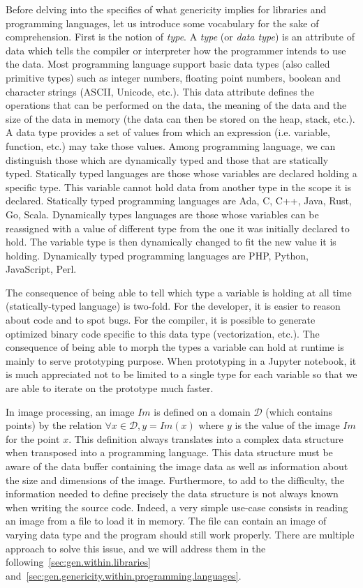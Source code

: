 Before delving into the specifics of what genericity implies for libraries and programming languages, let us introduce
some vocabulary for the sake of comprehension. First is the notion of \emph{type}. A \emph{type} (or \emph{data type})
is an attribute of data which tells the compiler or interpreter how the programmer intends to use the data. Most
programming language support basic data types (also called primitive types) such as integer numbers, floating point
numbers, boolean and character strings (ASCII, Unicode, etc.). This data attribute defines the operations that can be
performed on the data, the meaning of the data and the size of the data in memory (the data can then be stored on the
heap, stack, etc.). A data type provides a set of values from which an expression (i.e. variable, function, etc.) may
take those values. Among programming language, we can distinguish those which are dynamically typed and those that are
statically typed. Statically typed languages are those whose variables are declared holding a specific type. This
variable cannot hold data from another type in the scope it is declared. Statically typed programming languages are Ada,
C, C++, Java, Rust, Go, Scala. Dynamically types languages are those whose variables can be reassigned with a value of
different type from the one it was initially declared to hold. The variable type is then dynamically changed to fit the
new value it is holding. Dynamically typed programming languages are PHP, Python, JavaScript, Perl.

The consequence of being able to tell which type a variable is holding at all time (statically-typed language) is
two-fold. For the developer, it is easier to reason about code and to spot bugs. For the compiler, it is possible to
generate optimized binary code specific to this data type (vectorization, etc.). The consequence of being able to morph
the types a variable can hold at runtime is mainly to serve prototyping purpose. When prototyping in a Jupyter notebook,
it is much appreciated not to be limited to a single type for each variable so that we are able to iterate on the
prototype much faster.

In image processing, an image \(Im\) is defined on a domain \(\mathcal{D}\) (which contains points) by the relation
\(\forall x \in \mathcal{D}, y = Im(x)\) where \(y\) is the value of the image \(Im\) for the point \(x\). This
definition always translates into a complex data structure when transposed into a programming language. This data
structure must be aware of the data buffer containing the image data as well as information about the size and
dimensions of the image. Furthermore, to add to the difficulty, the information needed to define precisely the data
structure is not always known when writing the source code. Indeed, a very simple use-case consists in reading an image
from a file to load it in memory. The file can contain an image of varying data type and the program should still work
properly. There are multiple approach to solve this issue, and we will address them in the
following~\cref{sec:gen.within.libraries} and~\cref{sec:gen.genericity.within.programming.languages}.



